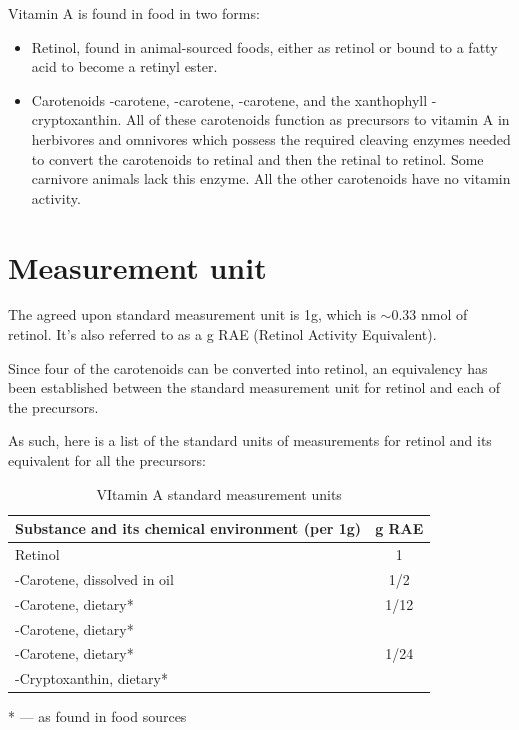 \documentclass{book}
\begin{document}
Vitamin A is found in food in two forms:
\begin{itemize}
	\item Retinol, found in animal-sourced foods, either as retinol or bound to a fatty acid to become a retinyl ester.
	\item Carotenoids \textalpha-carotene, \textbeta-carotene, \textgamma-carotene, and the xanthophyll \textbeta-cryptoxanthin. All of these carotenoids function as precursors to vitamin A in herbivores and omnivores which possess the required cleaving enzymes needed to convert the carotenoids to retinal and then the retinal to retinol. Some carnivore animals lack this enzyme. All the other carotenoids have no vitamin activity.
\end{itemize}

\section{Measurement unit}
The agreed upon standard measurement unit is 1\textmu g, which is $\sim$0.33 nmol of retinol. It's also referred to as a \textmu g RAE (Retinol Activity Equivalent).

Since four of the carotenoids can be converted into retinol, an equivalency has been established between the standard measurement unit for retinol and each of the precursors.

As such, here is a list of the standard units of measurements for retinol and its equivalent for all the precursors:

\begin{table}[h]
	\caption{VItamin A standard measurement units}
	\centering \begin{tabular}{| l | c |}
		\hline
		\textbf{Substance and its chemical environment (per 1\textmu g)} & \textbf{\textmu g RAE}\\ \hline
		Retinol & 1\\ \hline
		\textbeta -Carotene, dissolved in oil & 1/2\\ \hline
		\textbeta -Carotene, dietary* & 1/12\\ \hline
		\textalpha -Carotene, dietary* &\\
		\textgamma -Carotene, dietary*& 1/24\\
		\textbeta -Cryptoxanthin, dietary* &\\ \hline
	\end{tabular}
\end{table}

* --- as found in food sources
\newpage
\end{document}
